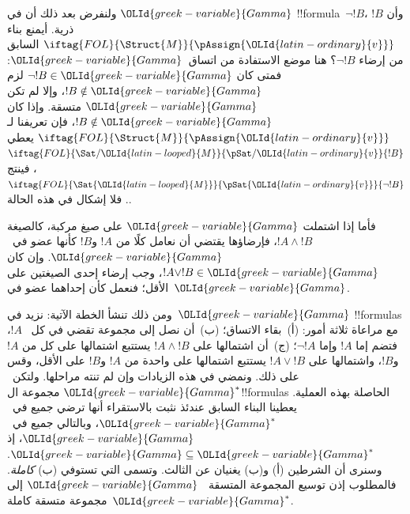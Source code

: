 \documentclass[../../../include/open-logic-section]{subfiles}
\begin{document}
ولنفرض بعد ذلك أن في ${\OLId{greek-variable}{Gamma}}$ !!{formula}~$\lnot !B$، وأن $!B$
ذرية. أيمنع بناء $\iftag{FOL}{\Struct{M}}{\pAssign{{\OLId{latin-ordinary}{v}}}}$ السابق من
إرضاء $\lnot !B$؟ هنا موضع الاستفادة من اتساق~${\OLId{greek-variable}{Gamma}}$: فمتى كان
$\lnot !B \in {\OLId{greek-variable}{Gamma}}$ لزم $!B \notin {\OLId{greek-variable}{Gamma}}$، وإلا لم تكن ${\OLId{greek-variable}{Gamma}}$
متسقة. وإذا كان $!B \notin {\OLId{greek-variable}{Gamma}}$، فإن تعريفنا لـ
$\iftag{FOL}{\Struct{M}}{\pAssign{{\OLId{latin-ordinary}{v}}}}$ يعطي
$\iftag{FOL}{\Sat/{{\OLId{latin-looped}{M}}}}{\pSat/{{\OLId{latin-ordinary}{v}}}}{!B}$، فينتج
$\iftag{FOL}{\Sat{{\OLId{latin-looped}{M}}}}{\pSat{{\OLId{latin-ordinary}{v}}}}{\lnot !B}$. فلا إشكال في هذه الحالة.

فأما إذا اشتملت ${\OLId{greek-variable}{Gamma}}$ على صيغ مركبة، كالصيغة $!A \land !B$،
فإرضاؤها يقتضي أن نعامل كلًا من $!A$ و$!B$ كأنها عضو
في~${\OLId{greek-variable}{Gamma}}$. وإن كان $!A \lor !B \in {\OLId{greek-variable}{Gamma}}$، وجب إرضاء إحدى
الصيغتين على الأقل؛ فنعمل كأن إحداهما عضو في~${\OLId{greek-variable}{Gamma}}$.

ومن ذلك تنشأ الخطة الآتية: نزيد في~${\OLId{greek-variable}{Gamma}}$ !!{formula}s مع مراعاة
ثلاثة أمور: (أ)~بقاء الاتساق؛ (ب)~أن نصل إلى مجموعة تقضي في كل
~$!A$، فتضم إما $!A$ وإما
$\lnot !A$؛ (ج)~أن اشتمالها على $!A \land !B$ يستتبع اشتمالها على
كل من $!A$ و$!B$، واشتمالها على $!A \lor !B$ يستتبع اشتمالها على
واحدة من $!A$ و$!B$ على الأقل، وقس على ذلك. ونمضي في هذه الزيادات
وإن لم تنته مراحلها. ولتكن~${\OLId{greek-variable}{Gamma}}^*$ مجموعة ال!!{formula}s الحاصلة
بهذه العملية. يعطينا البناء السابق عندئذ
نثبت بالاستقراء أنها ترضي جميع
 في~${\OLId{greek-variable}{Gamma}}^*$، وبالتالي
جميع  في~${\OLId{greek-variable}{Gamma}}$، إذ
${\OLId{greek-variable}{Gamma}} \subseteq {\OLId{greek-variable}{Gamma}}^*$. وسنرى أن الشرطين (أ) و(ب) يغنيان عن
الثالث. وتسمى 
التي تستوفي (ب) \emph{كاملة}. فالمطلوب إذن توسيع المجموعة المتسقة
~${\OLId{greek-variable}{Gamma}}$ إلى مجموعة متسقة كاملة~${\OLId{greek-variable}{Gamma}}^*$.
\end{document}
